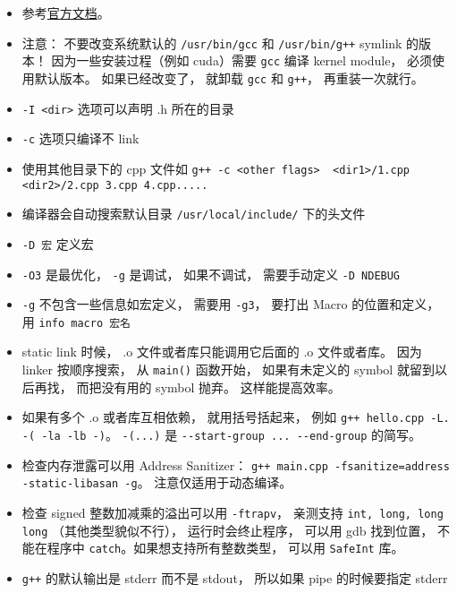 
\begin{issues}
\issueDraft
\end{issues}


\begin{itemize}
\item 参考\href{https://gcc.gnu.org/onlinedocs/gcc-12.2.0/gcc/}{官方文档}。
\item 注意： 不要改变系统默认的 \verb`/usr/bin/gcc` 和 \verb`/usr/bin/g++` symlink 的版本！ 因为一些安装过程（例如 cuda）需要 \verb`gcc` 编译 kernel module， 必须使用默认版本。 如果已经改变了， 就卸载 \verb`gcc` 和 \verb`g++`， 再重装一次就行。
\item \verb`-I <dir>` 选项可以声明 .h 所在的目录
\item \verb`-c` 选项只编译不 link
\item 使用其他目录下的 cpp 文件如 \verb`g++ -c <other flags>  <dir1>/1.cpp <dir2>/2.cpp 3.cpp 4.cpp.....`
\item 编译器会自动搜索默认目录 \verb`/usr/local/include/` 下的头文件
\item \verb`-D 宏` 定义宏
\item \verb`-O3` 是最优化， \verb`-g` 是调试， 如果不调试， 需要手动定义 \verb`-D NDEBUG`
\item \verb`-g` 不包含一些信息如宏定义， 需要用 \verb`-g3`， 要打出 Macro 的位置和定义， 用 \verb`info macro 宏名`
\item static link 时候， .o 文件或者库只能调用它后面的 .o 文件或者库。 因为 linker 按顺序搜索， 从 \verb`main()` 函数开始， 如果有未定义的 symbol 就留到以后再找， 而把没有用的 symbol 抛弃。 这样能提高效率。
\item 如果有多个 .o 或者库互相依赖， 就用括号括起来， 例如 \verb`g++ hello.cpp -L. -( -la -lb -)`。 \verb`-(...)` 是 \verb`--start-group ... --end-group` 的简写。
\item 检查内存泄露可以用 Address Sanitizer： \verb`g++ main.cpp -fsanitize=address -static-libasan -g`。 注意仅适用于动态编译。
\item 检查 signed 整数加减乘的溢出可以用 \verb`-ftrapv`， 亲测支持 \verb`int, long, long long` （其他类型貌似不行）， 运行时会终止程序， 可以用 gdb 找到位置， 不能在程序中 \verb`catch`。如果想支持所有整数类型， 可以用 \verb`SafeInt` 库。
\item \verb`g++` 的默认输出是 stderr 而不是 stdout， 所以如果 pipe 的时候要指定 stderr
\end{itemize}

